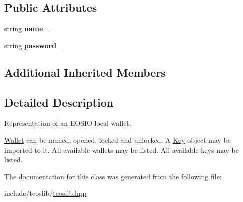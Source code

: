 \subsection*{Public Attributes}
\begin{DoxyCompactItemize}
\item 
\mbox{\label{classteoslib_1_1_wallet_a935befe97382d2481021076901951436}} 
string {\bfseries name\+\_\+}
\item 
\mbox{\label{classteoslib_1_1_wallet_a633892e13fc85c4e573785f4e3266660}} 
string {\bfseries password\+\_\+}
\end{DoxyCompactItemize}
\subsection*{Additional Inherited Members}


\subsection{Detailed Description}
Representation of an E\+O\+S\+IO local wallet. 

\mbox{\hyperlink{classteoslib_1_1_wallet}{Wallet}} can be named, opened, locked and unlocked. A \mbox{\hyperlink{classteoslib_1_1_key}{Key}} object may be imported to it. All available wallets may be listed. All available keys may be listed. 

The documentation for this class was generated from the following file\+:\begin{DoxyCompactItemize}
\item 
include/teoslib/\mbox{\hyperlink{teoslib_8hpp}{teoslib.\+hpp}}\end{DoxyCompactItemize}
